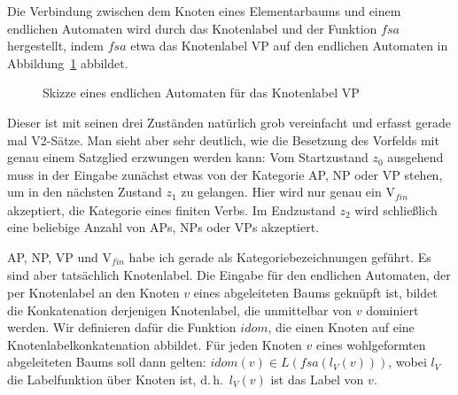 Die Verbindung zwischen dem Knoten eines Elementarbaums und einem endlichen Automaten wird durch das Knotenlabel und der Funktion $\mathit{fsa}$ hergestellt, indem $\mathit{fsa}$ etwa das Knotenlabel VP auf den endlichen Automaten in Abbildung~\ref{fig-fsa} abbildet.
\begin{figure}[t]
\centering
{}
\caption{\label{fig-fsa}Skizze eines endlichen Automaten für das Knotenlabel VP}
\end{figure} 
Dieser ist mit seinen drei Zuständen natürlich grob vereinfacht und erfasst gerade mal V2-Sätze. Man sieht aber sehr deutlich, wie die Besetzung des Vorfelds mit genau einem Satzglied erzwungen werden kann: Vom Startzustand $z_0$ ausgehend muss in der Eingabe zunächst etwas von der Kategorie AP, NP oder VP stehen, um in den nächsten Zustand $z_1$ zu gelangen. Hier wird nur genau ein V$_{\mathit{fin}}$ akzeptiert, die Kategorie eines finiten Verbs. Im Endzustand $z_2$ wird schlie\ss lich eine beliebige Anzahl von  APs, NPs oder VPs akzeptiert.   

AP, NP, VP und V$_{\mathit{fin}}$ habe ich gerade als Kategoriebezeichnungen geführt. Es sind aber tatsächlich Knotenlabel. Die Eingabe für den endlichen Automaten, der per Knotenlabel an den Knoten $v$ eines abgeleiteten Baums geknüpft ist, bildet die Konkatenation derjenigen Knotenlabel, die unmittelbar von $v$ dominiert werden. Wir definieren dafür die Funktion $\mathit{idom}$, die einen Knoten auf eine Knotenlabelkonkatenation abbildet. Für jeden Knoten $v$ eines wohlgeformten abgeleiteten Baums soll dann gelten: $\mathit{idom}(v) \in L(\mathit{fsa}(l_V(v)))$, wobei $l_V$ die Labelfunktion über Knoten ist, d.\,h.\ $l_V (v)$ ist das Label von $v$.   
 
